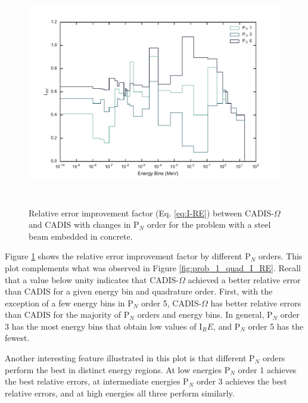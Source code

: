 \begin{figure}[h!]
  \centering
  \includegraphics[height=10cm]{./chapters/characterization_probs/figures/angle/prob_1/compare_err_pN.pdf}
  \caption[Relative error improvement factor (Eq. \eqref{eq:I-RE}) between CADIS-$\Omega$ and
  CADIS with changes in P$_N$ order for steel beam embedded in concrete.]
  {Relative error improvement factor (Eq. \eqref{eq:I-RE}) between CADIS-$\Omega$ and
   CADIS with changes in P$_N$ order for the problem with a
   steel beam embedded in concrete.}
  \label{fig:prob_1_pN_I_RE}
\end{figure}

Figure \ref{fig:prob_1_pN_I_RE} shows the relative error improvement factor by
different P$_N$ orders. This plot complements what was observed in Figure
\ref{fig:prob_1_quad_I_RE}. Recall that a value below unity indicates that
CADIS-$\Omega$ achieved a better relative error than CADIS for a given energy
bin and quadrature order. First, with the exception of a few energy bins in
P$_N$ order 5, CADIS-$\Omega$ has better relative errors than CADIS for the
majority of P$_N$ orders and energy bins. In general, P$_N$ order 3 has the most
energy bins that obtain low values of I$_RE$, and P$_N$ order 5 has the fewest.

Another interesting feature
illustrated in this plot is that different P$_N$ orders perform the best in
distinct energy regions. At low energies P$_N$ order 1 achieves the best
relative errors, at intermediate energies P$_N$ order 3 achieves the best
relative errors, and at high energies all three perform similarly.

